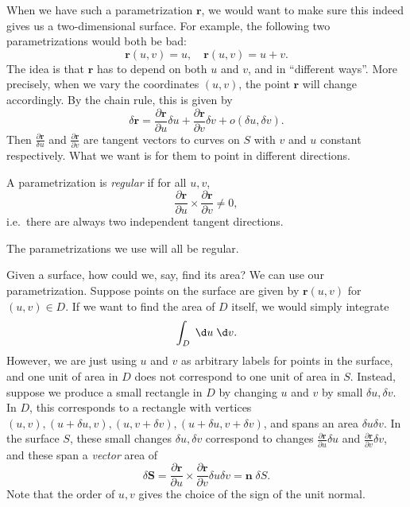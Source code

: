 \documentclass[a4paper]{article}
\begin{document}
When we have such a parametrization $\mathbf{r}$, we would want to make sure this indeed gives us a two-dimensional surface. For example, the following two parametrizations would both be bad:
\[
  \mathbf{r}(u, v) = u,\quad \mathbf{r}(u, v) = u + v.
\]
The idea is that $\mathbf{r}$ has to depend on both $u$ and $v$, and in ``different ways''. More precisely, when we vary the coordinates $(u, v)$, the point $\mathbf{r}$ will change accordingly. By the chain rule, this is given by
\[
  \delta \mathbf{r} = \frac{\partial \mathbf{r}}{\partial u}\delta u + \frac{\partial \mathbf{r}}{\partial v}\delta v + o(\delta u, \delta v).
\]
Then $\frac{\partial \mathbf{r}}{\delta u}$ and $\frac{\partial \mathbf{r}}{\partial v}$ are tangent vectors to curves on $S$ with $v$ and $u$ constant respectively. What we want is for them to point in different directions.

\begin{defi}
  A parametrization is \emph{regular} if for all $u, v$,
  \[
    \frac{\partial \mathbf{r}}{\partial u}\times \frac{\partial \mathbf{r}}{\partial v} \not = 0,
  \]
  i.e.\ there are always two independent tangent directions.
\end{defi}
The parametrizations we use will all be regular.

Given a surface, how could we, say, find its area? We can use our parametrization. Suppose points on the surface are given by $\mathbf{r}(u, v)$ for $(u, v) \in D$. If we want to find the area of $D$ itself, we would simply integrate
\[
  \int_D \;\d u\;\d v.
\]
However, we are just using $u$ and $v$ as arbitrary labels for points in the surface, and one unit of area in $D$ does not correspond to one unit of area in $S$. Instead, suppose we produce a small rectangle in $D$ by changing $u$ and $v$ by small $\delta u, \delta v$. In $D$, this corresponds to a rectangle with vertices $(u, v), (u + \delta u, v), (u, v + \delta v), (u + \delta u, v + \delta v)$, and spans an area $\delta u \delta v$. In the surface $S$, these small changes $\delta u, \delta v$ correspond to changes $\frac{\partial \mathbf{r}}{\partial u} \delta u$ and $\frac{\partial \mathbf{r}}{\partial v} \delta v$, and these span a \emph{vector} area of
\[
  \delta \mathbf{S} = \frac{\partial \mathbf{r}}{\partial u}\times \frac{\partial \mathbf{r}}{\partial v} \delta u \delta v= \mathbf{n}\;\delta S.
\]
Note that the order of $u, v$ gives the choice of the sign of the unit normal.
\end{document}
